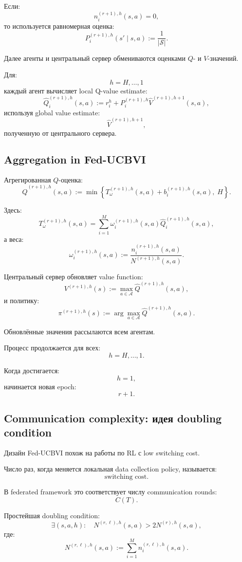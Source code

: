 \documentclass[12pt,a4paper]{article}
\begin{document}
Если:
\[
n_i^{(r+1),h}(s,a)=0,
\]
то используется равномерная оценка:
\[
P_i^{(r+1),h}(s'\mid s,a)
:=
\frac{1}{|\mathcal S|}.
\]

Далее агенты и центральный сервер обмениваются оценками $Q$- и $V$-значений.

Для:
\[
h=H,\ldots,1
\]
каждый агент вычисляет local Q-value estimate:
\[
\widehat Q_i^{(r+1),h}(s,a)
:=
r_i^h
+
P_i^{(r+1),h}
\widehat V^{(r+1),h+1}(s,a),
\]
используя global value estimate:
\[
\widehat V^{(r+1),h+1},
\]
полученную от центрального сервера.

\subsection{Aggregation in Fed-UCBVI}

Агрегированная $Q$-оценка:
\[
\widehat Q^{(r+1),h}(s,a)
:=
\min
\left\{
T_\omega^{(r+1),h}(s,a)
+
b_i^{(r+1),h}(s,a),
\;
H
\right\}.
\]

Здесь:
\[
T_\omega^{(r+1),h}(s,a)
=
\sum_{i=1}^{M}
\omega_i^{(r+1),h}(s,a)
\widehat Q_i^{(r+1),h}(s,a),
\]
а веса:
\[
\omega_i^{(r+1),h}(s,a)
:=
\frac{
n_i^{(r+1),h}(s,a)
}{
N^{(r+1),h}(s,a)
}.
\]

Центральный сервер обновляет value function:
\[
V^{(r+1),h}(s)
:=
\max_{a\in\mathcal A}
\widehat Q^{(r+1),h}(s,a),
\]
и политику:
\[
\pi^{(r+1),h}(s)
:=
\arg\max_{a\in\mathcal A}
\widehat Q^{(r+1),h}(s,a).
\]

Обновлённые значения рассылаются всем агентам.

Процесс продолжается для всех:
\[
h=H,\ldots,1.
\]

Когда достигается:
\[
h=1,
\]
начинается новая epoch:
\[
r+1.
\]

\subsection{Communication complexity: идея doubling condition}

Дизайн Fed-UCBVI похож на работы по RL с low switching cost.

Число раз, когда меняется локальная data collection policy, называется:
\[
\text{switching cost}.
\]

В federated framework это соответствует числу communication rounds:
\[
C(T).
\]

Простейшая doubling condition:
\[
\exists(s,a,h):
\quad
N^{(r,\ell),h}(s,a)
>
2N^{(r),h}(s,a),
\]
где:
\[
N^{(r,\ell),h}(s,a)
:=
\sum_{i=1}^{M}
n_i^{(r,\ell),h}(s,a).
\]
\end{document}
